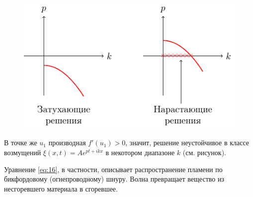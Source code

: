 \begin{figure}[H]
	\centering
	\includegraphics[scale=1.5]{img/osci_and_wave_in_ordered_struct/stability_or_instability} 
\end{figure}

В точке же $u_1$  производная $f'(u_1)>0$, значит, решение неустойчивое в классе возмущений $\xi(x,t)=A e^{pt+ikx}$ в некотором диапазоне $k$ (см. рисунок).

Уравнение \eqref{eq:16}, в частности, описывает распространение пламени по бикфордовому (огнепроводному) шнуру. Волна превращает вещество из несгоревшего материала в сгоревшее.